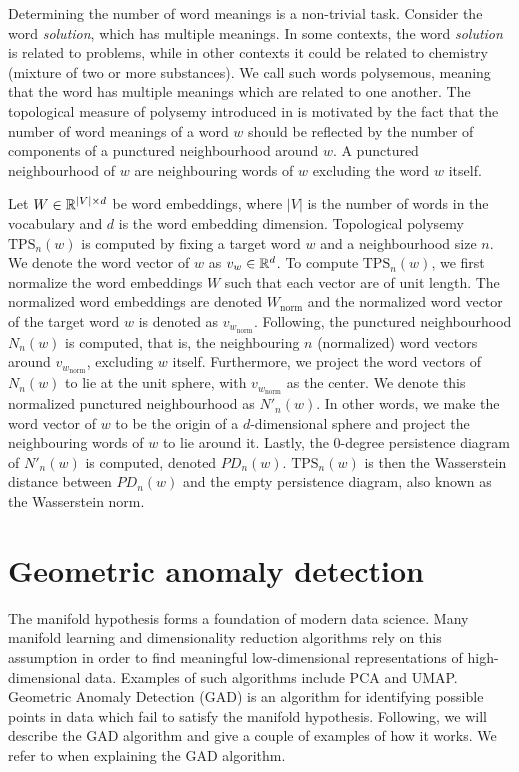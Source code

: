 Determining the number of word meanings is a non-trivial task. Consider the word \textit{solution}, which has multiple meanings. In some contexts, the word \textit{solution} is related to problems, while in other contexts it could be related to chemistry (mixture of two or more substances). We call such words polysemous, meaning that the word has multiple meanings which are related to one another. The topological measure of polysemy introduced in \cite{jakubowski2020topology} is motivated by the fact that the number of word meanings of a word $w$ should be reflected by the number of components of a punctured neighbourhood around $w$. A punctured neighbourhood of $w$ are neighbouring words of $w$ excluding the word $w$ itself.

Let $W \in \mathbb{R}^{|V| \times d}$ be word embeddings, where $|V|$ is the number of words in the vocabulary and $d$ is the word embedding dimension. Topological polysemy $\text{TPS}_n(w)$ is computed by fixing a target word $w$ and a neighbourhood size $n$. We denote the word vector of $w$ as $v_w \in \mathbb{R}^{d}$. To compute $\text{TPS}_n(w)$, we first normalize the word embeddings $W$ such that each vector are of unit length. The normalized word embeddings are denoted $W_\text{norm}$ and the normalized word vector of the target word $w$ is denoted as $v_{w_{\text{norm}}}$. Following, the punctured neighbourhood $N_n(w)$ is computed, that is, the neighbouring $n$ (normalized) word vectors around $v_{w_{\text{norm}}}$, excluding $w$ itself. Furthermore, we project the word vectors of $N_n(w)$ to lie at the unit sphere, with $v_{w_{\text{norm}}}$ as the center. We denote this normalized punctured neighbourhood as $N'_n(w)$. In other words, we make the word vector of $w$ to be the origin of a $d$-dimensional sphere and project the neighbouring words of $w$ to lie around it. Lastly, the 0-degree persistence diagram of $N'_n(w)$ is computed, denoted $PD_n(w)$. $\text{TPS}_n(w)$ is then the Wasserstein distance between $PD_n(w)$ and the empty persistence diagram, also known as the Wasserstein norm.

\section{Geometric anomaly detection}
\label{sec:geometric-anomaly-detection}
The manifold hypothesis forms a foundation of modern data science. Many manifold learning and dimensionality reduction algorithms rely on this assumption in order to find meaningful low-dimensional representations of high-dimensional data. Examples of such algorithms include PCA and UMAP. Geometric Anomaly Detection (GAD) \cite{stolz2020geometric} is an algorithm for identifying possible points in data which fail to satisfy the manifold hypothesis. Following, we will describe the GAD algorithm and give a couple of examples of how it works. We refer to \cite{stolz2020geometric} when explaining the GAD algorithm.


